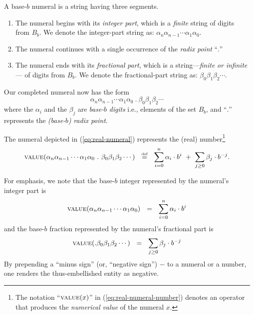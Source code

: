 A base-$b$ numeral is a string having three segments.
\begin{enumerate}
\item
The numeral begins with its {\em integer part},
%
which is a {\em finite} string of digits from $B_b$.  We denote the
integer-part string as: $\alpha_n \alpha_{n-1} \cdots \alpha_1
\alpha_0$.

\item
The numeral continues with a single occurrence of the {\it
  radix point}
``$.$''

\item
The numeral ends with its {\em fractional part},
%
which is a string---{\em finite or infinite}--- of digits from $B_b$.
We denote the fractional-part string as:
$\beta_0 \beta_1 \beta_2 \cdots$.
\end{enumerate}
Our completed numeral now has the form
\begin{equation}
\label{eq:real-numeral}
\alpha_n \alpha_{n-1} \cdots \alpha_1 \alpha_0
\ . \ \beta_0 \beta_1 \beta_2 \cdots
\end{equation}
where the $\alpha_i$ and the $\beta_j$
are {\em base-$b$ digits} i.e., elements of the set $B_b$, and
``$.$'' represents the {\em (base-$b$) radix point}.

\noindent
The numeral depicted in (\ref{eq:real-numeral}) represents the (real)
number\footnote{The notation ``$\mbox{\sc value}(x)$'' in
  (\ref{eq:real-numeral-number}) denotes an operator that produces the
  {\em numerical value} of the numeral $x$.}
\begin{equation}
\label{eq:real-numeral-number}
\mbox{\sc value}(\alpha_n \alpha_{n-1} \cdots \alpha_1 \alpha_0                  
\ . \ \beta_0 \beta_1 \beta_2 \cdots)
\ \ \stackrel{\mbox{{\tiny def}}}{=} \ \
\sum_{i=0}^n \alpha_i \cdot b^i
\ + \ \sum_{j\geq 0} \beta_j \cdot b^{-j}.
\end{equation}

For emphasis, we note that the base-$b$ integer 
represented by the numeral's integer part is
\[
\mbox{\sc value}(\alpha_n \alpha_{n-1}\cdots \alpha_1 \alpha_0)
\ \ = \ \
\sum_{i=0}^n \alpha_i \cdot b^i
\]
and the base-$b$ fraction represented by the numeral's fractional part
is
\[
\mbox{\sc value}(. \beta_0 \beta_1 \beta_2 \cdots)
\ \ = \ \
\sum_{j\geq 0} \beta_j \cdot b^{-j}
\]
By prepending a ``minus sign'' (or, ``negative sign'') $-$ to a
numeral or a number, one renders the thus-embellished entity as
negative.

